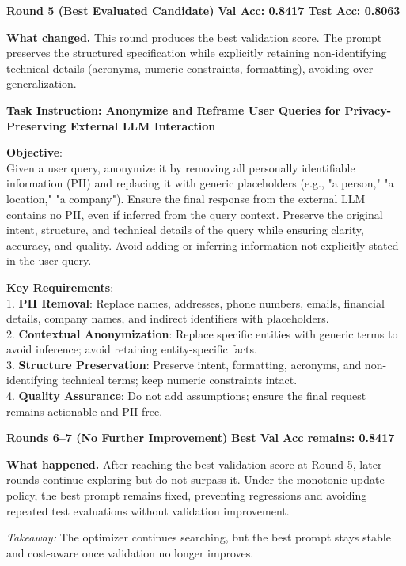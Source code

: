 \begin{roundbox}
\textbf{Round 5 (Best Evaluated Candidate)} \hfill \textbf{Val Acc: 0.8417 \;\; Test Acc: 0.8063}
\end{roundbox}

\noindent \textbf{What changed.} This round produces the best validation score. The prompt preserves the structured specification while explicitly retaining non-identifying technical details (acronyms, numeric constraints, formatting), avoiding over-generalization.

\begin{prompttext}
\textbf{Task Instruction: Anonymize and Reframe User Queries for Privacy-Preserving External LLM Interaction}

\textbf{Objective}: \\
Given a user query, anonymize it by removing all personally identifiable information (PII) and replacing it with generic placeholders (e.g., "a person," "a location," "a company"). Ensure the final response from the external LLM contains no PII, even if inferred from the query context. Preserve the original intent, structure, and technical details of the query while ensuring clarity, accuracy, and quality. Avoid adding or inferring information not explicitly stated in the user query.

\textbf{Key Requirements}: \\
1. \textbf{PII Removal}: Replace names, addresses, phone numbers, emails, financial details, company names, and indirect identifiers with placeholders. \\
2. \textbf{Contextual Anonymization}: Replace specific entities with generic terms to avoid inference; avoid retaining entity-specific facts. \\
3. \textbf{Structure Preservation}: Preserve intent, formatting, acronyms, and non-identifying technical terms; keep numeric constraints intact. \\
4. \textbf{Quality Assurance}: Do not add assumptions; ensure the final request remains actionable and PII-free.
\end{prompttext}

\begin{roundbox}
\textbf{Rounds 6--7 (No Further Improvement)} \hfill \textbf{Best Val Acc remains: 0.8417}
\end{roundbox}

\noindent \textbf{What happened.} After reaching the best validation score at Round 5, later rounds continue exploring but do not surpass it. Under the monotonic update policy, the best prompt remains fixed, preventing regressions and avoiding repeated test evaluations without validation improvement.

\begin{prompttext}
\textit{Takeaway:} The optimizer continues searching, but the best prompt stays stable and cost-aware once validation no longer improves.
\end{prompttext}